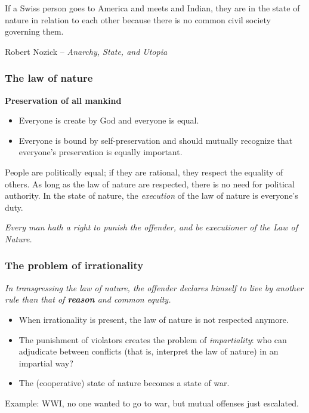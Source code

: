 If a Swiss person goes to America and meets and Indian, they are in the state of
nature in relation to each other because there is no common civil society
governing them.

Robert Nozick -- \textit{Anarchy, State, and Utopia}

\subsubsection{The law of nature}

\textbf{Preservation of all mankind}

\begin{itemize}
    \item Everyone is create by God and everyone is equal.
    \item Everyone is bound by self-preservation and should mutually recognize
    that everyone's preservation is equally important.
\end{itemize}

People are politically equal; if they are rational, they respect the equality of
others. As long as the law of nature are respected, there is no need for
political authority. In the state of nature, the \textit{execution} of the law
of nature is everyone's duty.

\textit{Every man hath a right to punish the offender, and be executioner of the
Law of Nature.}

\subsubsection{The problem of irrationality}

\textit{In transgressing the law of nature, the offender declares himself to
live by another rule than that of \textbf{reason} and common equity.}

\begin{itemize}
    \item When irrationality is present, the law of nature is not respected
    anymore.
    \item The punishment of violators creates the problem of
    \textit{impartiality}: who can adjudicate between conflicts (that is,
    interpret the law of nature) in an impartial way?
    \item The (cooperative) state of nature becomes a state of war.
\end{itemize}

Example: WWI, no one wanted to go to war, but mutual offenses just escalated.

